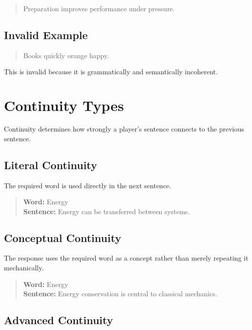 \documentclass[11pt,a4paper]{article}
\begin{document}
\begin{quote}
Preparation improves performance under pressure.
\end{quote}

\subsection{Invalid Example}

\begin{quote}
Books quickly orange happy.
\end{quote}

This is invalid because it is grammatically and semantically incoherent.

\section{Continuity Types}

Continuity determines how strongly a player's sentence connects to the previous sentence.

\subsection{Literal Continuity}

The required word is used directly in the next sentence.

\begin{quote}
\textbf{Word:} Energy\\
\textbf{Sentence:} Energy can be transferred between systems.
\end{quote}

\subsection{Conceptual Continuity}

The response uses the required word as a concept rather than merely repeating it mechanically.

\begin{quote}
\textbf{Word:} Energy\\
\textbf{Sentence:} Energy conservation is central to classical mechanics.
\end{quote}

\subsection{Advanced Continuity}
\end{document}
